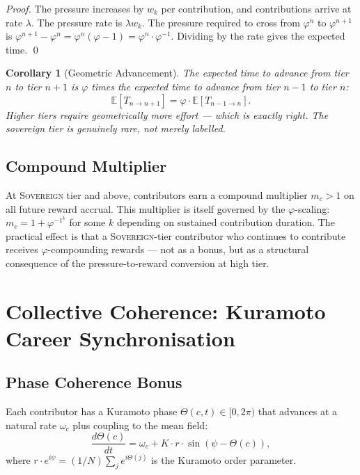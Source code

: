 \documentclass[12pt]{article}
\newtheorem{corollary}[theorem]{Corollary}
\newcommand{\PHI}{\varphi}
\newcommand{\PHIINV}{\varphi^{-1}}
\newcommand{\tier}[1]{\textsc{#1}}
\begin{document}
\begin{proof}
  The pressure increases by $w_k$ per contribution, and contributions arrive at
  rate $\lambda$.  The pressure rate is $\lambda w_k$.  The pressure required to
  cross from $\PHI^n$ to $\PHI^{n+1}$ is $\PHI^{n+1} - \PHI^n = \PHI^n(\PHI - 1)
  = \PHI^n \cdot \PHIINV$.  Dividing by the rate gives the expected time. \qed
\end{proof}

\begin{corollary}[Geometric Advancement]
  The expected time to advance from tier $n$ to tier $n+1$ is $\PHI$ times
  the expected time to advance from tier $n-1$ to tier $n$:
  \[
    \mathbb{E}[T_{n \to n+1}] = \PHI \cdot \mathbb{E}[T_{n-1 \to n}].
  \]
  Higher tiers require geometrically more effort — which is exactly right.
  The sovereign tier is genuinely rare, not merely labelled.
\end{corollary}

\subsection{Compound Multiplier}

At \tier{Sovereign} tier and above, contributors earn a compound multiplier
$m_c > 1$ on all future reward accrual.  This multiplier is itself governed
by the $\PHI$-scaling: $m_c = 1 + \PHIINV^k$ for some $k$ depending on
sustained contribution duration.  The practical effect is that a
\tier{Sovereign}-tier contributor who continues to contribute receives
$\PHI$-compounding rewards — not as a bonus, but as a structural consequence
of the pressure-to-reward conversion at high tier.

\section{Collective Coherence: Kuramoto Career Synchronisation}
\label{sec:kuramoto}

\subsection{Phase Coherence Bonus}

Each contributor has a Kuramoto phase $\Theta(c, t) \in [0, 2\pi)$ that
advances at a natural rate $\omega_c$ plus coupling to the mean field:
\begin{equation}
  \frac{d\Theta(c)}{dt} = \omega_c
    + K \cdot r \cdot \sin(\psi - \Theta(c)),
  \label{eq:kuramoto_career}
\end{equation}
where $r \cdot e^{i\psi} = (1/N) \sum_j e^{i\Theta(j)}$ is the Kuramoto
order parameter.
\end{document}
